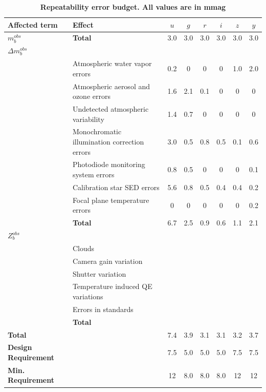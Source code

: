 \documentclass[12pt,preprint]{aastex}
\begin{document}
\clearpage



\begin{landscape}
\begin{center}
\begin{table}[htb]
\caption{{\bf Repeatability error budget.  All values are in mmag} }
\begin{tabular}{l | l | c c c c c c }
Affected term & Effect &  $u$  & $g$ & $r$ & $i$ & $z$ & $y$ \\ \hline
{\bf $m_b^{obs}$} & {\bf Total} & 3.0 & 3.0 & 3.0 & 3.0 & 3.0 & 3.0 \\ \hline
{\bf $\Delta m_b^{obs}$} & & & & \\
& Atmospheric water vapor errors & 0.2 & 0 & 0 & 0 & 1.0 & 2.0  \\
& Atmospheric aerosol and ozone errors & 1.6 & 2.1 & 0.1 & 0 & 0 & 0  \\
& Undetected atmospheric variability & 1.4 & 0.7 & 0 & 0 & 0 & 0 \\
& Monochromatic illumination correction errors & 3.0 & 0.5 & 0.8 & 0.5 & 0.1 & 0.6\\
& Photodiode monitoring system errors & 0.8 & 0.5 & 0 & 0 & 0 & 0.1 \\
& Calibration star SED errors & 5.6 & 0.8 & 0.5 & 0.4 & 0.4 & 0.2 \\
& Focal plane temperature errors & 0 & 0 & 0 & 0 & 0 & 0.2 \\ 
& {\bf Total} & 6.7 & 2.5 & 0.9 & 0.6 & 1.1 & 2.1 \\ \hline
$Z_b^{obs}$ & & & & \\
& Clouds & & &  \\
& Camera gain variation & & & \\
& Shutter variation & & & \\
& Temperature induced QE variations & & & \\
& Errors in standards & & & \\
& {\bf Total} & & & \\ \hline
{\bf Total} & & 7.4 & 3.9 & 3.1 & 3.1 & 3.2 & 3.7 \\ \hline
{\bf Design Requirement} & & 7.5 & 5.0 & 5.0 & 5.0 & 7.5 & 7.5 \\ 
{\bf Min. Requirement} & & 12 & 8.0 & 8.0 & 8.0 & 12 & 12 \\
\end{tabular}
\label{tab:rpt_error_budget}
\end{table}
\end{center}
\end{landscape}
\end{document}
